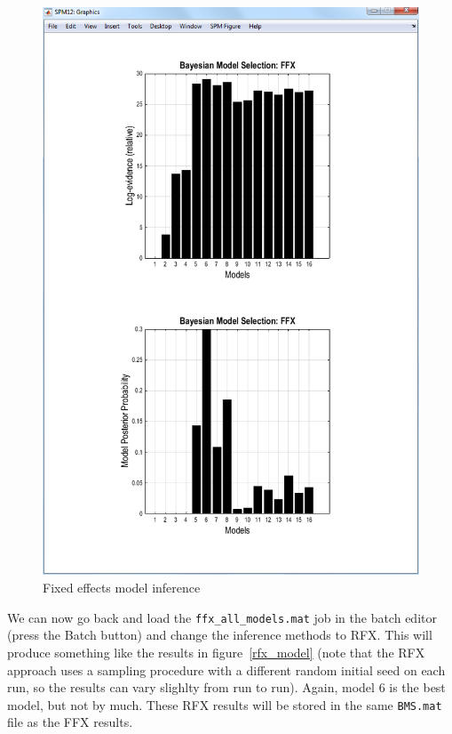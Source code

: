 \begin{figure}
\begin{center}
\includegraphics[width=150mm]{bms/Slide2.png}
\caption{Fixed effects model inference\label{ffx_model}}
\end{center}
\end{figure}

We can now go back and load the \verb!ffx_all_models.mat! job in the batch editor (press the Batch button) and change the inference methods to RFX. This will produce something like the results in figure~\ref{rfx_model} (note that the RFX approach uses a sampling procedure with a different random initial seed on each run, so the results can vary slighlty from run to run). Again, model 6 is the best model, but not by much. These RFX results will be stored in the same \verb!BMS.mat! file as the FFX results.

